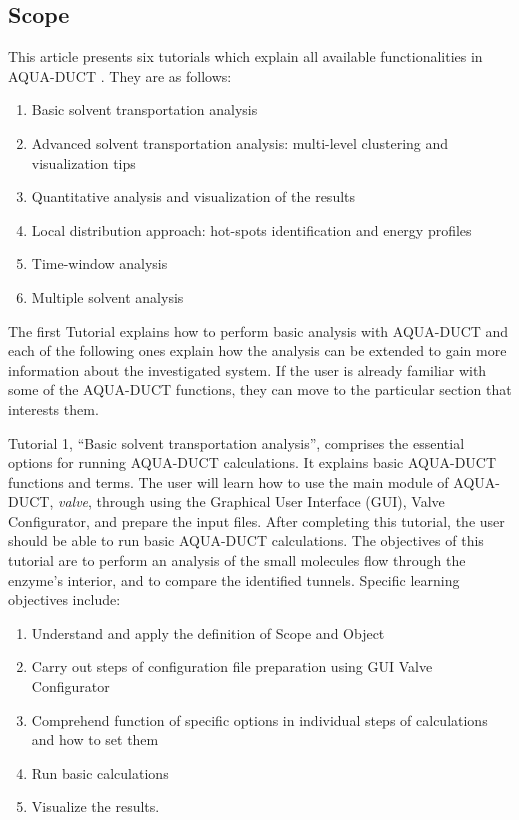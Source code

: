 \documentclass[9pt,tutorial]{livecoms}
\begin{document}
\subsection{Scope}

This article presents six tutorials which explain all available functionalities in AQUA-DUCT \cite{Magdziarz2020}. They are as follows:
\begin{enumerate}
\item Basic solvent transportation analysis
\item Advanced solvent transportation analysis: multi-level clustering and visualization tips
\item Quantitative analysis and visualization of the results
\item Local distribution approach: hot-spots identification and energy profiles
\item Time-window analysis
\item Multiple solvent analysis
\end{enumerate}

The first Tutorial explains how to perform basic analysis with AQUA-DUCT and each of the following ones explain how the analysis can be extended to gain more information about the investigated system. If the user is already familiar with some of the AQUA-DUCT functions, they can move to the particular section that interests them. 

Tutorial 1, “Basic solvent transportation analysis”, comprises the essential options for running AQUA-DUCT calculations. It explains basic AQUA-DUCT functions and terms. The user will learn how to use the main module of AQUA-DUCT, \textit{valve}, through using the Graphical User Interface (GUI), Valve Configurator, and prepare the input files. After completing this tutorial, the user should be able to run basic AQUA-DUCT calculations. The objectives of this tutorial are to perform an analysis of the small molecules flow through the enzyme's interior, and to compare the identified tunnels. Specific learning objectives include:
\begin{enumerate}
  \item Understand and apply the definition of Scope and Object
  \item Carry out steps of configuration file preparation using GUI Valve Configurator
  \item Comprehend function of specific options in individual steps of calculations and how to set them
  \item Run basic calculations
  \item Visualize the results.
\end{enumerate}
\end{document}
